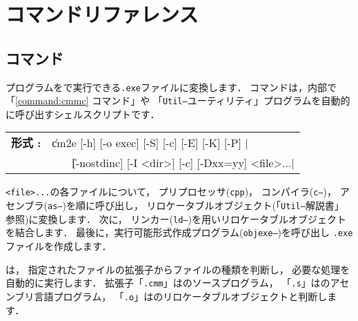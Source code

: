 % 
%
\chapter{コマンドリファレンス}
\label{app:command}


\section{{\cme}コマンド}

{\cmm}プログラムを{\tac}で実行できる{\tt .exe}ファイルに変換します．
{\cme}コマンドは，内部で「\ref{command:cmmc} {\cmmc}コマンド」や
「{\tt Util--}ユーティリティ」プログラムを自動的に呼び出すシェルスクリプトです．

\begin{flushleft}
\begin{tabular}{l l}
{\bf 形式 : } & \|cm2e [-h] [-o exec] [-S] [-c] [-E] [-K] [-P] | \\
              & ~~~ \| [-nostdinc] [-I <dir>] [-c] [-Dxx=yy] <file>...|
\end{tabular}
\end{flushleft}

{\tt <file>...}の各ファイルについて，
プリプロセッサ({\tt cpp})，
コンパイラ({\tt c--})，
アセンブラ({\tt as--})を順に呼び出し，
リロケータブルオブジェクト(「{\tt Util--}解説書」参照)に変換します．
次に，
リンカー({\tt ld--})を用いリロケータブルオブジェクトを結合します．
最後に，実行可能形式作成プログラム({\tt objexe--})を呼び出し
{\tt .exe}ファイルを作成します．

{\cme}は，
指定されたファイルの拡張子からファイルの種類を判断し，
必要な処理を自動的に実行します．
拡張子「{\tt .cmm}」は{\cmml}のソースプログラム，
「{\tt .s}」は{\tac}のアセンブリ言語プログラム，
「{\tt .o}」は{\tac}のリロケータブルオブジェクトと判断します．

